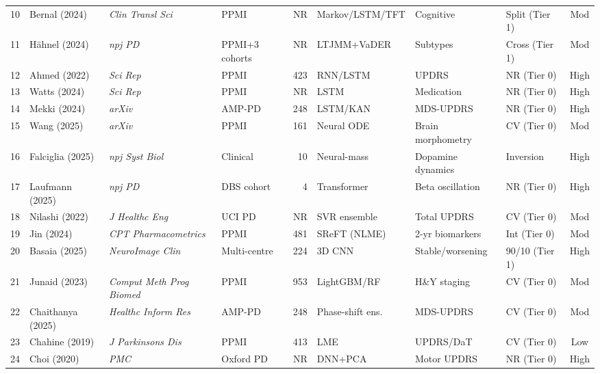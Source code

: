 \documentclass[11pt,a4paper]{article}
\begin{document}
\begin{landscape}
\begin{table}[p]
\begin{tabularx}{\linewidth}{@{}clllrlllc@{}}
10 & Bernal (2024)     & \textit{Clin Transl Sci} & PPMI              & NR    & Markov/LSTM/TFT & Cognitive         & Split (Tier 1) & Mod \\
11 & H\"ahnel (2024)   & \textit{npj PD}          & PPMI+3 cohorts    & NR    & LTJMM+VaDER    & Subtypes           & Cross (Tier 1) & Mod \\
12 & Ahmed (2022)      & \textit{Sci Rep}         & PPMI              & 423   & RNN/LSTM       & UPDRS              & NR (Tier 0)  & High \\
13 & Watts (2024)      & \textit{Sci Rep}         & PPMI              & NR    & LSTM           & Medication         & NR (Tier 0)  & High \\
14 & Mekki (2024)      & \textit{arXiv}           & AMP-PD            & 248   & LSTM/KAN       & MDS-UPDRS          & NR (Tier 0)  & High \\
15 & Wang (2025)       & \textit{arXiv}           & PPMI              & 161   & Neural ODE     & Brain morphometry  & CV (Tier 0)  & Mod \\
16 & Falciglia (2025)  & \textit{npj Syst Biol}   & Clinical          & 10    & Neural-mass    & Dopamine dynamics  & Inversion    & High \\
17 & Laufmann (2025)   & \textit{npj PD}          & DBS cohort        & 4     & Transformer    & Beta oscillation   & NR (Tier 0)  & High \\
18 & Nilashi (2022)    & \textit{J Healthc Eng}   & UCI PD            & NR    & SVR ensemble   & Total UPDRS        & CV (Tier 0)  & Mod \\
19 & Jin (2024)        & \textit{CPT Pharmacometrics} & PPMI           & 481   & SReFT (NLME)   & 2-yr biomarkers    & Int (Tier 0) & Mod \\
20 & Basaia (2025)     & \textit{NeuroImage Clin} & Multi-centre      & 224   & 3D CNN         & Stable/worsening   & 90/10 (Tier 1) & High \\
21 & Junaid (2023)     & \textit{Comput Meth Prog Biomed} & PPMI      & 953   & LightGBM/RF    & H\&Y staging       & CV (Tier 0)  & Mod \\
22 & Chaithanya (2025) & \textit{Healthc Inform Res} & AMP-PD         & 248   & Phase-shift ens.& MDS-UPDRS         & CV (Tier 0)  & Mod \\
23 & Chahine (2019)    & \textit{J Parkinsons Dis}& PPMI              & 413   & LME            & UPDRS/DaT          & CV (Tier 0)  & Low \\
24 & Choi (2020)       & \textit{PMC}             & Oxford PD         & NR    & DNN+PCA        & Motor UPDRS        & NR (Tier 0)  & High \\

\end{tabularx}
\end{table}
\end{landscape}
\end{document}
